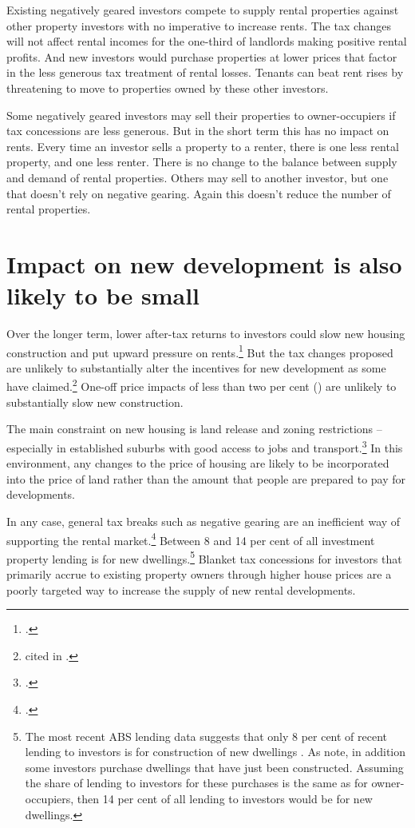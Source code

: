 Existing negatively geared investors compete to supply rental properties against other property investors with no imperative to increase rents. The tax changes will not affect rental incomes for the one-third of landlords making positive rental profits. And new investors would purchase properties at lower prices that factor in the less generous tax treatment of rental losses. Tenants can beat rent rises by threatening to move to properties owned by these other investors. 

Some negatively geared investors may sell their properties to owner-occupiers if tax concessions are less generous. But in the short term this has no impact on rents.  Every time an investor sells a property to a renter, there is one less rental property, and one less renter. There is no change to the balance between supply and demand of rental properties. Others may sell to another investor, but one that doesn’t rely on negative gearing. Again this doesn’t reduce the number of rental properties. 

\section{Impact on new development is also likely to be small}\label{sec:Impact-new-development}
Over the longer term, lower after-tax returns to investors could slow new housing construction and put upward pressure on rents.\footcites{Poterba1984}{AlmFollain1994} But the tax changes proposed are unlikely to substantially alter the incentives for new development as some have claimed.\footnote{\textcite{BISShrapnel2016} cited in \textcite{Daley2016onBIS}.} One-off price impacts of less than two per cent () are unlikely to substantially slow new construction.

The main constraint on new housing is land release and zoning restrictions – especially in established suburbs with good access to jobs and transport.\footcites{KellyHarrisonHunterEtAl2013}[][84--90]{KellyDonegan2015} In this environment, any changes to the price of housing are likely to be incorporated into the price of land rather than the amount that people are prepared to pay for developments. 

In any case, general tax breaks such as negative gearing are an inefficient way of supporting the rental market.\footcite{HenryTaxReview2010} Between 8 and 14 per cent of all investment property lending is for new dwellings.\footnote{The most recent ABS lending data suggests that only 8 per cent of recent lending to investors is for construction of new dwellings \textcite{ABS2016}. As \textcite{StapledonRoberts2016} note, in addition some investors purchase dwellings that have just been constructed. Assuming the share of lending to investors for these purchases is the same as for owner-occupiers, then 14 per cent of all lending to investors would be for new dwellings.}   Blanket tax concessions for investors that primarily accrue to existing property owners through higher house prices are a poorly targeted way to increase the supply of new rental developments.

